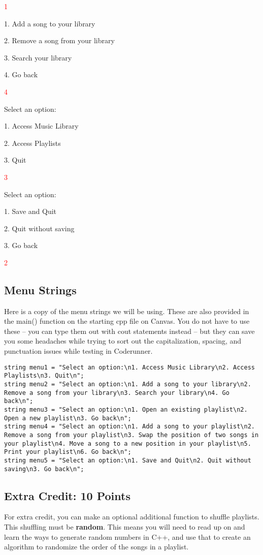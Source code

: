 \begin{sample}
\textcolor{red}{1}

1. Add a song to your library

2. Remove a song from your library

3. Search your library

4. Go back

\textcolor{red}{4}

Select an option:

1. Access Music Library

2. Access Playlists

3. Quit

\textcolor{red}{3}

Select an option:

1. Save and Quit

2. Quit without saving

3. Go back

\textcolor{red}{2}
\end{sample}

\subsection{Menu Strings}
Here is a copy of the menu strings we will be using. These are also provided in the main() function on the starting cpp file on Canvas. You do not have to use these -- you can type them out with cout statements instead -- but they can save you some headaches while trying to sort out the capitalization, spacing, and punctuation issues while testing in Coderunner.

\begin{verbatim}
string menu1 = "Select an option:\n1. Access Music Library\n2. Access Playlists\n3. Quit\n";
string menu2 = "Select an option:\n1. Add a song to your library\n2. Remove a song from your library\n3. Search your library\n4. Go back\n";
string menu3 = "Select an option:\n1. Open an existing playlist\n2. Open a new playlist\n3. Go back\n";
string menu4 = "Select an option:\n1. Add a song to your playlist\n2. Remove a song from your playlist\n3. Swap the position of two songs in your playlist\n4. Move a song to a new position in your playlist\n5. Print your playlist\n6. Go back\n";
string menu5 = "Select an option:\n1. Save and Quit\n2. Quit without saving\n3. Go back\n";
\end{verbatim}

\subsection{Extra Credit: 10 Points}
For extra credit, you can make an optional additional function to shuffle playlists. This shuffling must be \textbf{random}. This means you will need to read up on and learn the ways to generate random numbers in C++, and use that to create an algorithm to randomize the order of the songs in a playlist. 

